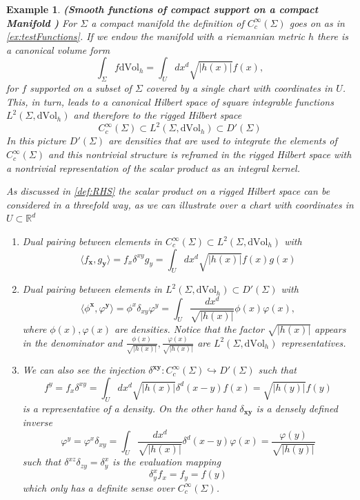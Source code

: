 \documentclass[12pt]{article}%
\newcommand{\mb}[1]{{\mathbf{#1}}}
\newtheorem{example}{Example}%
\begin{document}
\begin{example}\label{ex:testFunctionsManifold}{\bf (Smooth functions of compact support on a compact Manifold )} For $\Sigma$ a compact manifold the definition of $C^\infty_c(\Sigma)$ goes on as in \autoref{ex:testFunctions}. If we endow the manifold with a riemannian metric $h$ there is a canonical volume form 
\begin{equation}
\label{eq:riemannianVolumeform}
\int_\Sigma f\mathrm{dVol}_h=\int_U dx^d \sqrt{\lvert h(x)\rvert} f(x),
\end{equation}
for $f$ supported on a subset of $\Sigma$ covered by  a single chart with coordinates in $U$. This, in turn, leads to a canonical Hilbert space of square integrable functions $L^2(\Sigma,\mathrm{dVol}_h)$ and therefore to the rigged Hilbert space 
\begin{equation}
\label{eq:riggedOnAManifold}
C^\infty_c(\Sigma)\subset L^2(\Sigma,\mathrm{dVol}_h) \subset D'(\Sigma)
\end{equation}  
In this picture $D'(\Sigma)$ are densities that are used to integrate the elements of $C^\infty_c(\Sigma)$ and this nontrivial structure is reframed in the rigged Hilbert space with a nontrivial representation of the scalar product as an integral kernel.  

As discussed in \autoref{def:RHS} the scalar product on a rigged Hilbert space can be considered in a threefold way, as we can illustrate over a chart with coordinates in $U\subset \mathbb{R}^d$

\begin{enumerate}[label=\alph*)]
        \item Dual pairing between elements in $C^\infty_c(\Sigma)\subset L^2(\Sigma,\mathrm{dVol}_h)$ with $$\langle f_\mb{x} ,g_\mb{y}\rangle =f_x\delta^{xy}g_y=\int_U dx^d\sqrt{\lvert h(x)\rvert} f(x)g(x)$$
    \item Dual pairing between elements in  $L^2(\Sigma,\mathrm{dVol}_h) \subset D'(\Sigma)$ with $$\langle\phi^{\mathbf{x}} ,\varphi^{\mathbf{y}}\rangle =\phi^x\delta_{xy}\varphi^y=\int_U\frac{dx^d}{\sqrt{\lvert h(x)\rvert}} \phi(x)\varphi(x),$$
    where $\phi(x),\varphi(x)$ are densities. Notice that the factor $\sqrt{\lvert h(x)\rvert}$ appears in the denominator and $\frac{\phi(x)}{\sqrt{\lvert h(x)\rvert}}, \frac{\varphi(x)}{\sqrt{\lvert h(x)\rvert}}$ are $L^2(\Sigma, \mathrm{dVol}_h)$ representatives.
    \item We can also see the injection ${\delta^{\mathbf{xy}}}:C^\infty_c(\Sigma) \hookrightarrow D'(\Sigma)$  such that
    $$f^y=f_x\delta^{xy}=\int_U dx^d\sqrt{\lvert h(x)\rvert}\delta^d(x-y) f(x)=\sqrt{\lvert h(y)\rvert}f(y)$$
    is a representative of a density. On the other hand $\delta_{\mathbf{xy}}$ is a densely defined inverse 
    $$\varphi^y=\varphi^x\delta_{xy}=\int_U \frac{dx^d}{\sqrt{\lvert h(x)\rvert}}\delta^d(x-y) \varphi(x)=\frac{\varphi(y)}{\sqrt{\lvert h(y)\rvert}}$$
    such that $\delta^{xz}\delta_{zy}=\delta^x_y$ is the evaluation mapping
    $$\delta^x_yf_x=f_y=f(y)$$
    which only has a definite sense over $C^\infty_c(\Sigma)$.
\end{enumerate}


\end{example}
\end{document}
